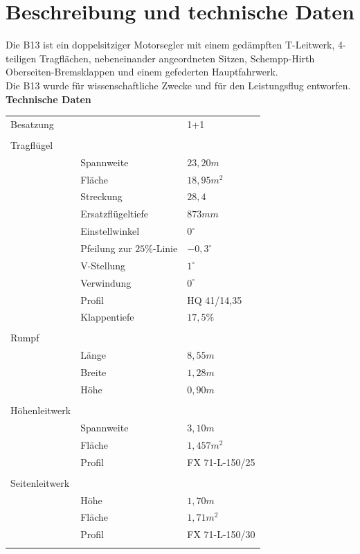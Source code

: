 \section{Beschreibung und technische Daten}
Die B13 ist ein doppelsitziger Motorsegler mit einem gedämpften T-Leitwerk, 4-teiligen Tragflächen, nebeneinander angeordneten Sitzen, Schempp-Hirth Oberseiten-Bremsklappen und einem gefederten Hauptfahrwerk.\\
\newline
Die B13 wurde für wissenschaftliche Zwecke und für den Leistungsflug entworfen.
\newpage
\textbf{Technische Daten}\\

\begin{longtable}{l l l}
Besatzung & & 1+1\\
 & & \\
 Tragflügel & & \\
  & Spannweite & $23,20m$\\
  & Fläche & $18,95m^2$\\
  & Streckung & $28,4$ \\
  & Ersatzflügeltiefe & $873mm$ \\
  & Einstellwinkel & $0^{\circ}$ \\
  & Pfeilung zur $25\%$-Linie & $-0,3^{\circ}$ \\
  & V-Stellung & $1^{\circ}$\\
  & Verwindung & $0^{\circ}$\\
  & Profil & HQ 41/14,35\\
  & Klappentiefe & $17,5\%$ \\
  & & \\
 Rumpf & & \\
 & Länge & $8,55m$\\
 & Breite & $1,28m$\\
 & Höhe & $0,90m$ \\
 & & \\
 Höhenleitwerk & & \\
 & Spannweite & $3,10m$\\
 & Fläche & $1,457m^2$\\
 & Profil & FX 71-L-150/25 \\
 & & \\
 Seitenleitwerk & & \\
 & Höhe & $1,70m$ \\
 & Fläche & $1,71m^2$\\
 & Profil & FX 71-L-150/30\\
 & & \\

\end{longtable}
